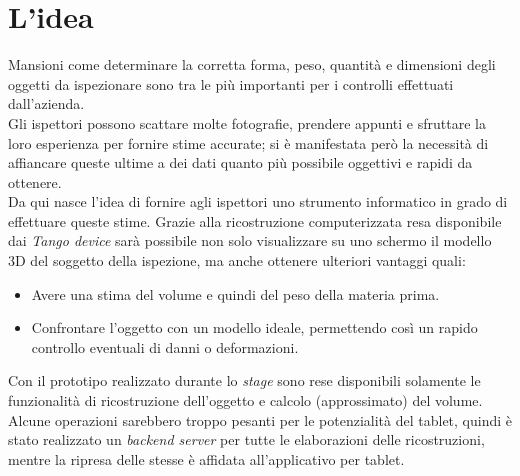 \section{L'idea}

Mansioni come determinare la corretta forma, peso, quantità e dimensioni degli oggetti da ispezionare sono tra le più importanti per i controlli effettuati dall'azienda.\\
Gli ispettori possono scattare molte fotografie, prendere appunti e sfruttare la loro esperienza per fornire stime accurate; si è manifestata però la necessità di affiancare queste ultime a dei dati quanto più possibile oggettivi e rapidi da ottenere.\\
Da qui nasce l'idea di fornire agli ispettori uno strumento informatico in grado di effettuare queste stime. Grazie alla ricostruzione computerizzata resa disponibile dai \emph{Tango device} sarà possibile non solo visualizzare su uno schermo il modello 3D del soggetto della ispezione, ma anche ottenere ulteriori vantaggi quali:
\begin{itemize}
	\item Avere una stima del volume e quindi del peso della materia prima.
	\item Confrontare l'oggetto con un modello ideale, permettendo così un rapido controllo eventuali di danni o deformazioni.
\end{itemize}
Con il prototipo realizzato durante lo \emph{stage} sono rese disponibili solamente le funzionalità di ricostruzione dell'oggetto e calcolo (approssimato) del volume.\\
Alcune operazioni sarebbero troppo pesanti per le potenzialità del tablet, quindi è stato realizzato un \emph{backend server} per tutte le elaborazioni delle ricostruzioni, mentre la ripresa delle stesse è affidata all'applicativo per tablet.

